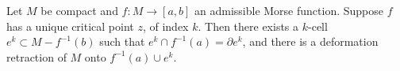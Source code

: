 Let $M$ be compact and $f: M \to [a, b]$ an admissible Morse function. Suppose $f$ has a unique critical point $z$, of index $k$. Then there exists a $k$-cell $e^k \subset M - f^{-1}(b)$ such that $e^k \cap f^{-1}(a) = \partial e^k$, and there is a deformation retraction of $M$ onto $f^{-1}(a) \cup e^k$.
